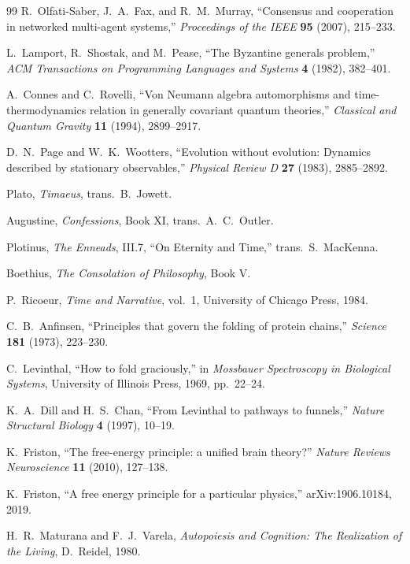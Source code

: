 \documentclass[11pt]{article}
\theoremstyle{remark}
\theoremstyle{plain}
\begin{document}
\begin{thebibliography}{99}
R.\ Olfati-Saber, J.\ A.\ Fax, and R.\ M.\ Murray,
``Consensus and cooperation in networked multi-agent systems,''
\emph{Proceedings of the IEEE} \textbf{95} (2007), 215--233.

L.\ Lamport, R.\ Shostak, and M.\ Pease,
``The Byzantine generals problem,''
\emph{ACM Transactions on Programming Languages and Systems} \textbf{4} (1982), 382--401.

A.\ Connes and C.\ Rovelli,
``Von Neumann algebra automorphisms and time-thermodynamics relation in generally covariant quantum theories,''
\emph{Classical and Quantum Gravity} \textbf{11} (1994), 2899--2917.

D.\ N.\ Page and W.\ K.\ Wootters,
``Evolution without evolution: Dynamics described by stationary observables,''
\emph{Physical Review D} \textbf{27} (1983), 2885--2892.

Plato,
\emph{Timaeus},
trans.\ B.\ Jowett.

Augustine,
\emph{Confessions}, Book XI,
trans.\ A.\ C.\ Outler.

Plotinus,
\emph{The Enneads}, III.7, ``On Eternity and Time,''
trans.\ S.\ MacKenna.

Boethius,
\emph{The Consolation of Philosophy}, Book V.

P.\ Ricoeur,
\emph{Time and Narrative}, vol.\ 1,
University of Chicago Press, 1984.

C.\ B.\ Anfinsen,
``Principles that govern the folding of protein chains,''
\emph{Science} \textbf{181} (1973), 223--230.

C.\ Levinthal,
``How to fold graciously,''
in \emph{Mossbauer Spectroscopy in Biological Systems},
University of Illinois Press, 1969, pp.\ 22--24.

K.\ A.\ Dill and H.\ S.\ Chan,
``From Levinthal to pathways to funnels,''
\emph{Nature Structural Biology} \textbf{4} (1997), 10--19.

K.\ Friston,
``The free-energy principle: a unified brain theory?''
\emph{Nature Reviews Neuroscience} \textbf{11} (2010), 127--138.

K.\ Friston,
``A free energy principle for a particular physics,''
arXiv:1906.10184, 2019.

H.\ R.\ Maturana and F.\ J.\ Varela,
\emph{Autopoiesis and Cognition: The Realization of the Living},
D.\ Reidel, 1980.


\end{thebibliography}
\end{document}
